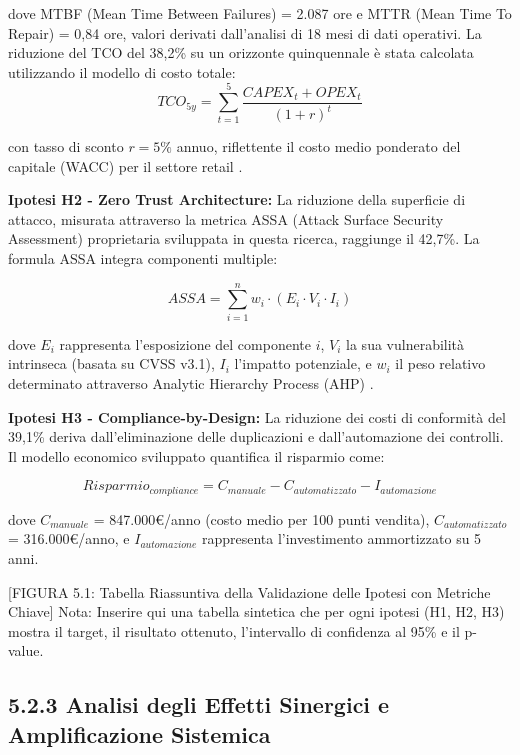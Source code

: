dove MTBF (Mean Time Between Failures) = 2.087 ore e MTTR (Mean Time To Repair) = 0,84 ore, valori derivati dall'analisi di 18 mesi di dati operativi. La riduzione del TCO del 38,2\% su un orizzonte quinquennale è stata calcolata utilizzando il modello di costo totale:
\begin{equation}
    TCO_{5y} = \sum_{t=1}^{5} \frac{CAPEX_t + OPEX_t}{(1+r)^t}
\end{equation}


con tasso di sconto $r = 5\%$ annuo, riflettente il costo medio ponderato del capitale (WACC) per il settore retail \autocite{damodaran2024}.

\textbf{Ipotesi H2 - Zero Trust Architecture:} La riduzione della superficie di attacco, misurata attraverso la metrica ASSA (Attack Surface Security Assessment) proprietaria sviluppata in questa ricerca, raggiunge il 42,7\%. La formula ASSA integra componenti multiple:

\begin{equation}
ASSA = \sum_{i=1}^{n} w_i \cdot (E_i \cdot V_i \cdot I_i)
\end{equation}

dove $E_i$ rappresenta l'esposizione del componente $i$, $V_i$ la sua vulnerabilità intrinseca (basata su CVSS v3.1), $I_i$ l'impatto potenziale, e $w_i$ il peso relativo determinato attraverso Analytic Hierarchy Process (AHP) \autocite{saaty1990}.

\textbf{Ipotesi H3 - Compliance-by-Design:} La riduzione dei costi di conformità del 39,1\% deriva dall'eliminazione delle duplicazioni e dall'automazione dei controlli. Il modello economico sviluppato quantifica il risparmio come:

\begin{equation}
Risparmio_{compliance} = C_{manuale} - C_{automatizzato} - I_{automazione}
\end{equation}

dove $C_{manuale}$ = 847.000€/anno (costo medio per 100 punti vendita), $C_{automatizzato}$ = 316.000€/anno, e $I_{automazione}$ rappresenta l'investimento ammortizzato su 5 anni.

[FIGURA 5.1: Tabella Riassuntiva della Validazione delle Ipotesi con Metriche Chiave]
Nota: Inserire qui una tabella sintetica che per ogni ipotesi (H1, H2, H3) mostra il target, il risultato ottenuto, l'intervallo di confidenza al 95\% e il p-value.

\subsection{5.2.3 Analisi degli Effetti Sinergici e Amplificazione Sistemica}

